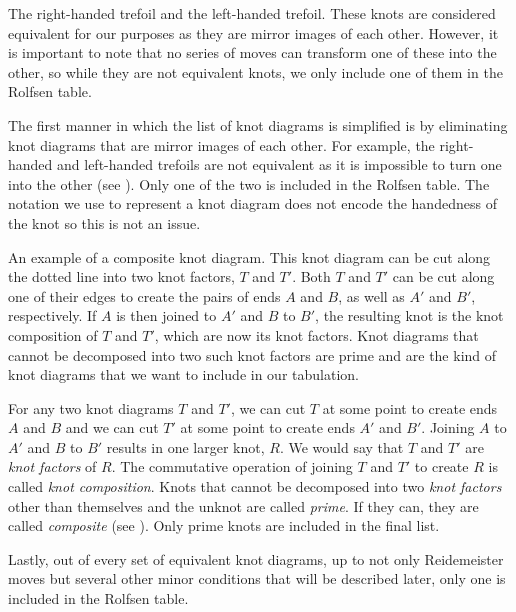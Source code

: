 \begin{paper}
{The right-handed trefoil and the left-handed trefoil.
These knots are considered equivalent for our purposes as they are mirror images
of each other.
However, it is important to note that no series of moves can transform one of
these into the other, so while they are not equivalent knots, we only include
one of them in the Rolfsen table.}

The first manner in which the list of knot diagrams is simplified is by
eliminating knot diagrams that are mirror images of each other.
For example, the right-handed and left-handed trefoils are not equivalent as it
is impossible to turn one into the other (see \figTrefoil).
Only one of the two is included in the Rolfsen table.
The notation we use to represent a knot diagram does not encode the handedness
of the knot so this is not an issue.

{An example of a composite knot diagram.
This knot diagram can be cut along the dotted line into two knot factors, $T$
and $T'$.
Both $T$ and $T'$ can be cut along one of their edges to create the pairs of
ends $A$ and $B$, as well as $A'$ and $B'$, respectively.
If $A$ is then joined to $A'$ and $B$ to $B'$, the resulting knot is the knot
composition of $T$ and $T'$, which are now its knot factors.
Knot diagrams that cannot be decomposed into two such knot factors are prime and
are the kind of knot diagrams that we want to include in our tabulation.}

For any two knot diagrams $T$ and $T'$, we can cut $T$ at some point to create
ends $A$ and $B$ and we can cut $T'$ at some point to create ends $A'$ and $B'$.
Joining $A$ to $A'$ and $B$ to $B'$ results in one larger knot, $R$.
We would say that $T$ and $T'$ are \textit{knot factors} of $R$.
The commutative operation of joining $T$ and $T'$ to create $R$ is called
\textit{knot composition}.
Knots that cannot be decomposed into two \textit{knot factors} other than
themselves and the unknot are called \textit{prime}.
If they can, they are called \textit{composite} (see \figComposite).
Only prime knots are included in the final list.

Lastly, out of every set of equivalent knot diagrams, up to not only
Reidemeister moves but several other minor conditions that will be described
later, only one is included in the Rolfsen table.


\end{paper}
